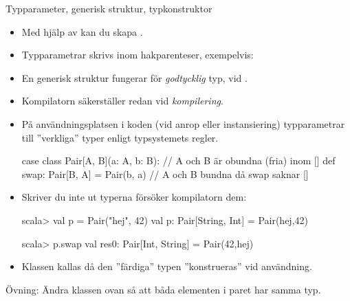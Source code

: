 



\begin{Slide}{Typparameter, generisk struktur, typkonstruktor}
\begin{itemize}\SlideFontTiny
\item Med hjälp av   kan du skapa  .
\item Typparametrar skrivs inom hakparenteser, exempelvis: \code{ [T, U] }
\item En generisk struktur fungerar för \emph{godtycklig} typ,  vid . 
\item Kompilatorn säkerställer   redan vid \emph{kompilering}.
\item På användningsplatsen i koden (vid anrop eller instansiering)  typparametrar till ''verkliga'' typer enligt typsystemets regler. 
\begin{Code}
case class Pair[A, B](a: A, b: B):  // A och B är obundna (fria) inom []
  def swap: Pair[B, A] = Pair(b, a) // A och B bundna då swap saknar []
\end{Code}
\item Skriver du inte ut typerna försöker kompilatorn   dem:
\begin{REPLsmall}
scala> val p = Pair("hej", 42)
val p: Pair[String, Int] = Pair(hej,42)

scala> p.swap
val res0: Pair[Int, String] = Pair(42,hej)
\end{REPLsmall}
\item Klassen  kallas   då den ''färdiga'' typen  ''konstrueras'' vid användning.
\end{itemize}
\pause\SlideFontTiny
\ifkompendium\else
\vspace{-0.5em}
\fi
Övning: Ändra klassen  ovan så att båda elementen i paret har samma typ.
\end{Slide}


